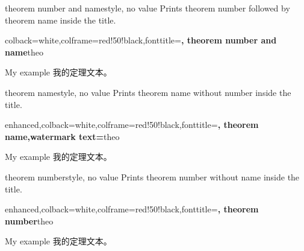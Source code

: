 \begin{docTcbKey}{theorem number and name}{}{style, no value}
Prints theorem number followed by theorem name inside the title.
\begin{dispExample}
%
  {colback=white,colframe=red!50!black,fonttitle=\bfseries,
   theorem number and name}{theo}
\begin{sometheorem}{My example}{}
我的定理文本。
\end{sometheorem}
\end{dispExample}
\end{docTcbKey}

\begin{docTcbKey}{theorem name}{}{style, no value}
Prints theorem name without number inside the title.


\begin{dispExample}
%
  {enhanced,colback=white,colframe=red!50!black,fonttitle=\bfseries,
   theorem name,watermark text={\thetcbcounter}}{theo}
\begin{sometheorem}{My example}{}
我的定理文本。
\end{sometheorem}
\end{dispExample}
\end{docTcbKey}

\enlargethispage*{20mm}

\begin{docTcbKey}[][doc new=2021-12-03]{theorem number}{}{style, no value}
Prints theorem number without name inside the title.
\begin{dispExample}
%
  {enhanced,colback=white,colframe=red!50!black,fonttitle=\bfseries,
   theorem number}{theo}
\begin{sometheorem}{My example}{}
我的定理文本。
\end{sometheorem}
\end{dispExample}
\end{docTcbKey}


